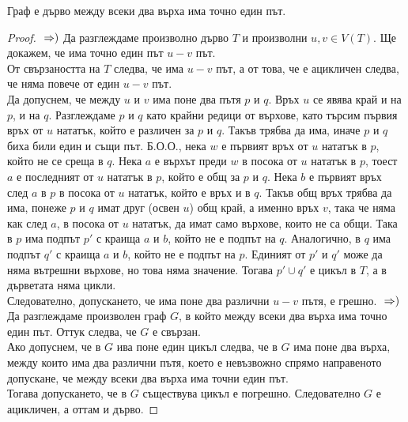 \begin{theorem}
    Граф е дърво \totw между всеки два върха има точно един път.
\end{theorem}
\begin{proof}
    \(\newline\Rightarrow)\) Да разглеждаме произволно дърво \(T\) и произволни \(u, v \in V(T)\). Ще 
    докажем, че има точно един път \(u-v\) път. \\
    От свързаността на \(T\) следва, че има \(u-v\) път, а от това, че е ацикличен следва, че няма повече 
    от един \(u-v\) път. \\
    Да допуснем, че между \(u\) и \(v\) има поне два пътя \(p\) и \(q\). Връх \(u\) се явява край и на \(p\), 
    и на \(q\). Разглеждаме \(p\) и \(q\) като крайни редици от върхове, като търсим първия връх от \(u\) 
    нататък, който е различен за \(p\) и \(q\). Такъв трябва да има, иначе \(p\) и \(q\) биха били един 
    и същи път. Б.О.О., нека \(w\) е първият връх от \(u\) нататък в \(p\), който не се среща в \(q\). 
    Нека \(a\) е върхът преди \(w\) в посока от \(u\) нататък в \(p\), тоест \(a\) е последният от 
    \(u\) нататък в \(p\), който е общ за \(p\) и \(q\). Нека \(b\) е първият връх след \(a\) в \(p\) в 
    посока от \(u\) нататък, който е връх и в \(q\). Такъв общ връх трябва да има, понеже \(p\) и \(q\) 
    имат друг (освен \(u\)) общ край, а именно връх \(v\), така че няма как след \(a\), в посока от 
    \(u\) нататък, да имат само върхове, които не са общи. Така в \(p\) има подпът \(p'\) с краища 
    \(a\) и \(b\), който не е подпът на \(q\). Аналогично, в \(q\) има подпът \(q'\) с краища \(a\) и \(b\), 
    който не е подпът на \(p\). Единият от \(p'\) и \(q'\) може да няма вътрешни върхове, но това няма 
    значение. Тогава \(p' \cup q'\) е цикъл в \(T\), а в дърветата няма цикли. \\
    Следователно, допускането, че има поне два различни \(u-v\) пътя, е грешно.
    \(\newline\Rightarrow)\) Да разглеждаме произволен граф \(G\), в който между всеки два върха има точно 
    един път. Оттук следва, че \(G\) е свързан. \\
    Ако допуснем, че в \(G\) ива поне един цикъл следва, че в \(G\) има поне два върха, между които има два
    различни пътя, което е невъзвожно спрямо направеното допускане, че между всеки два върха има точни 
    един път. \\
    Тогава допускането, че в \(G\) съществува цикъл е погрешно. Следователно \(G\) е ацикличен, а оттам и 
    дърво.
\end{proof}

